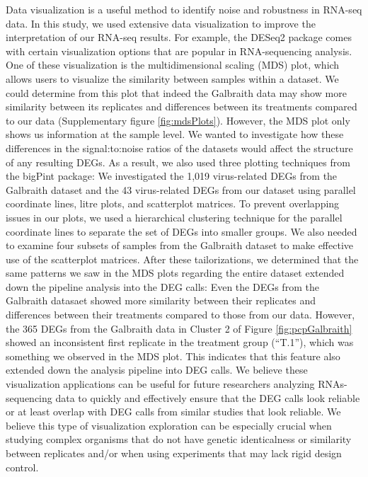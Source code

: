 \documentclass[11pt,a4paper,oldfontcommands,openany]{memoir}
\numberwithin{equation}{section} %
\begin{document}
Data visualization is a useful method to identify noise and robustness in RNA-seq data. In this study, we used extensive data visualization to improve the interpretation of our RNA-seq results.  For example, the DESeq2 package comes with certain visualization options that are popular in RNA-sequencing analysis. One of these visualization is the multidimensional scaling (MDS) plot, which allows users to visualize the similarity between samples within a dataset. We could determine from this plot that indeed the Galbraith data may show more similarity between its replicates and differences between its treatments compared to our data (Supplementary figure \ref{fig:mdsPlots}). However, the MDS plot only shows us information at the sample level. We wanted to investigate how these differences in the signal:to:noise ratios of the datasets would affect the structure of any resulting DEGs. As a result, we also used three plotting techniques from the bigPint package: We investigated the 1,019 virus-related DEGs from the Galbraith dataset and the 43 virus-related DEGs from our dataset using parallel coordinate lines, litre plots, and scatterplot matrices. To prevent overlapping issues in our plots, we used a hierarchical clustering technique for the parallel coordinate lines to separate the set of DEGs into smaller groups. We also needed to examine four subsets of samples from the Galbraith dataset to make effective use of the scatterplot matrices. After these tailorizations, we determined that the same patterns we saw in the MDS plots regarding the entire dataset extended down the pipeline analysis into the DEG calls: Even the DEGs from the Galbraith datasaet showed more similarity between their replicates and differences between their treatments compared to those from our data. However, the 365 DEGs from the Galbraith data in Cluster 2 of Figure \ref{fig:pcpGalbraith} showed an inconsistent first replicate in the treatment group (``T.1''), which was something we observed in the MDS plot. This indicates that this feature also extended down the analysis pipeline into DEG calls. We believe these visualization applications can be useful for future researchers analyzing RNAs-sequencing data to quickly and effectively ensure that the DEG calls look reliable or at least overlap with DEG calls from similar studies that look reliable. We believe this type of visualization exploration can be especially crucial when studying complex organisms that do not have genetic identicalness or similarity between replicates and/or when using experiments that may lack rigid design control.
\end{document}
